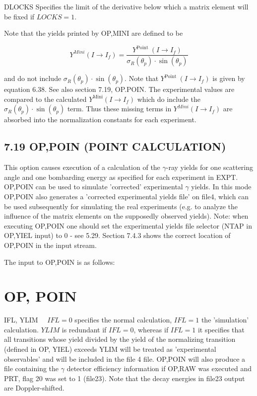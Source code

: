 \documentclass[10pt]{article}
\begin{document}
DLOCKS Specifies the limit of the derivative below which a matrix element will be fixed if $L O C K S=1$.

Note that the yields printed by OP,MINI are defined to be

$$
Y^{M i n i}\left(I \rightarrow I_{f}\right)=\frac{Y^{\text {Point }}\left(I \rightarrow I_{f}\right)}{\sigma_{R}\left(\theta_{p}\right) \cdot \sin \left(\theta_{p}\right)}
$$

and do not include $\sigma_{R}\left(\theta_{p}\right) \cdot \sin \left(\theta_{p}\right)$. Note that $Y^{\text {Point }}\left(I \rightarrow I_{f}\right)$ is given by equation 6.38. See also section 7.19, OP.POIN. The experimental values are compared to the calculated $Y^{\operatorname{Mini}}\left(I \rightarrow I_{f}\right)$ which do include the $\sigma_{R}\left(\theta_{p}\right) \cdot \sin \left(\theta_{p}\right)$ term. Thus these missing terms in $Y^{M i n i}\left(I \rightarrow I_{f}\right)$ are absorbed into the normalization constants for each experiment.

\subsection*{7.19 OP,POIN (POINT CALCULATION)}
This option causes execution of a calculation of the $\gamma$-ray yields for one scattering angle and one bombarding energy as specified for each experiment in EXPT. OP,POIN can be used to simulate 'corrected' experimental $\gamma$ yields. In this mode OP,POIN also generates a 'corrected experimental yields file' on file4, which can be used subsequently for simulating the real experiments (e.g. to analyze the influence of the matrix elements on the supposedly observed yields). Note: when executing OP,POIN one should set the experimental yields file selector (NTAP in OP,YIEL input) to 0 - see 5.29. Section 7.4.3 shows the correct location of OP,POIN in the input stream.

The input to OP,POIN is as follows:

\section*{OP, POIN}
IFL, YLIM $\quad I F L=0$ specifies the normal calculation, $I F L=1$ the 'simulation' calculation. $Y L I M$ is redundant if $I F L=0$, whereas if $I F L=1$ it specifies that all transitions whose yield divided by the yield of the normalizing transition (defined in OP, YIEL) exceeds YLIM will be treated as 'experimental observables' and will be included in the file 4 file. OP,POIN will also produce a file containing the $\gamma$ detector efficiency information if OP,RAW was executed and PRT, flag 20 was set to 1 (file23). Note that the decay energies in file23 output are Doppler-shifted.
\end{document}
